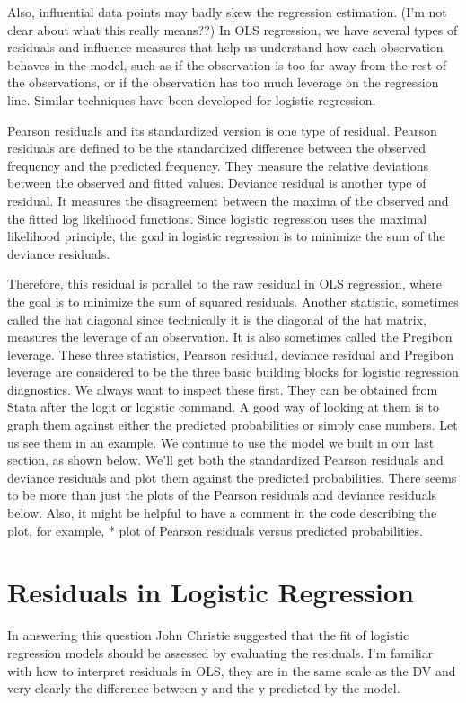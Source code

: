 \documentclass[a4paper,12pt]{article}
\begin{document}
Also, influential data points may badly skew the regression estimation. (I'm not clear about what this really means??) In OLS regression, we have several types of  residuals and influence measures that help us understand how each observation behaves in the model, such as if the observation is too far away from the rest of the observations, or if the observation has too much leverage on the regression line. Similar techniques have been developed for logistic regression.

Pearson residuals and its standardized version is one type of residual. Pearson residuals are defined to be the standardized difference between the observed frequency and the predicted frequency. They measure the relative deviations between the observed and fitted values. Deviance residual is another type of residual. It measures the disagreement between the maxima of the observed and the fitted log likelihood functions. Since logistic regression uses the maximal likelihood principle, the goal in logistic regression is to minimize the sum of the deviance residuals. 

Therefore, this residual is parallel to the raw residual in OLS regression, where the goal is to minimize the sum of squared residuals. Another statistic, sometimes called the hat diagonal since technically it is the diagonal of the hat matrix, measures the leverage of an observation. It is also sometimes called the Pregibon leverage. These three statistics, Pearson residual, deviance residual and Pregibon leverage are considered to be the three basic building blocks for logistic regression diagnostics. We always want to inspect these first. They can be obtained from Stata after the logit or logistic command. A good way of looking at them is to graph them against either the predicted probabilities or simply case numbers. Let us see them in an example. We continue to use the model we built in our last section, as shown below. We'll get both the standardized Pearson residuals and deviance residuals and plot them against the predicted probabilities. There seems to be more than just the plots of the Pearson residuals and deviance residuals below. Also, it might be helpful to have a comment in the code describing the plot, for example, * plot of Pearson residuals versus predicted probabilities.


\section{Residuals in Logistic Regression}
In answering this question John Christie suggested that the fit of logistic regression models should be assessed by evaluating the residuals. I'm familiar with how to interpret residuals in OLS, they are in the same scale as the DV and very clearly the difference between y and the y predicted by the model. 
\end{document}
